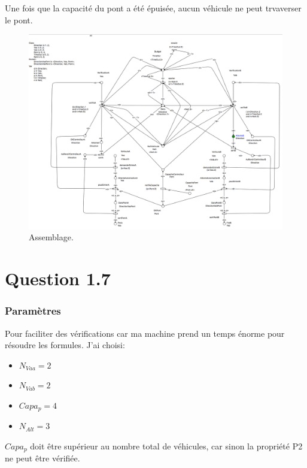 \documentclass[a4paper,11pt]{report}
\begin{document}
	Une fois que la capacité du pont a été épuisée, aucun véhicule ne peut trvaverser le pont. 
	\begin{figure}[!htbp]
		\includegraphics[width = 18cm]{allModel.png}
		\caption{Assemblage.}
	\end{figure}
	\newpage
	
\section{Question 1.7}
\subsubsection{Paramètres}
	Pour faciliter des vérifications car ma machine prend un temps énorme pour résoudre les formules. J'ai choisi:
	\begin{itemize}
		\item $N_{Vaa} = 2$
		\item $N_{Vab} = 2$
		\item $Capa_p = 4$
		\item $N_{Alt} = 3$
	\end{itemize}
	
	$Capa_p$ doit être supérieur au nombre total de véhicules, car sinon la propriété P2 ne peut être vérifiée.
\end{document}
